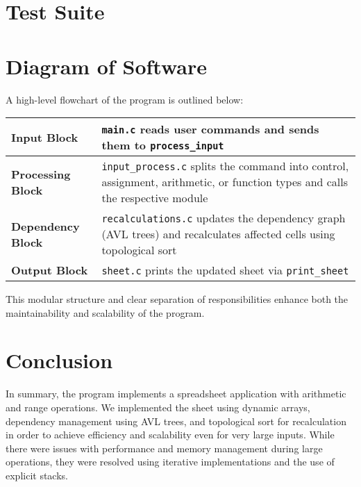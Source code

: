 \documentclass[12pt,letterpaper,onecolumn]{exam}
\begin{document}
\section{Test Suite}


\section{Diagram of Software}

A high-level flowchart of the program is outlined below:

\begin{center}
\begin{tabularx}{\textwidth}{|X|X|}
    \hline
    \textbf{Input Block} & \texttt{main.c} reads user commands and sends them to \texttt{process\_input} \\
    \hline
    \textbf{Processing Block} & \texttt{input\_process.c} splits the command into control, assignment, arithmetic, or function types and calls the respective module \\
    \hline
    \textbf{Dependency Block} & \texttt{recalculations.c} updates the dependency graph (AVL trees) and recalculates affected cells using topological sort \\
    \hline
    \textbf{Output Block} & \texttt{sheet.c} prints the updated sheet via \texttt{print\_sheet} \\
    \hline
\end{tabularx}
\end{center}

This modular structure and clear separation of responsibilities enhance both the maintainability and scalability of the program.

\section{Conclusion}

In summary, the program implements a spreadsheet application with arithmetic and range operations. We implemented the sheet using dynamic arrays, dependency management using AVL trees, and topological sort for recalculation in order to achieve efficiency and scalability even for very large inputs. While there were issues with performance and memory management during large operations, they were resolved using iterative implementations and the use of explicit stacks.

\pagestyle{plain}
\end{document}
